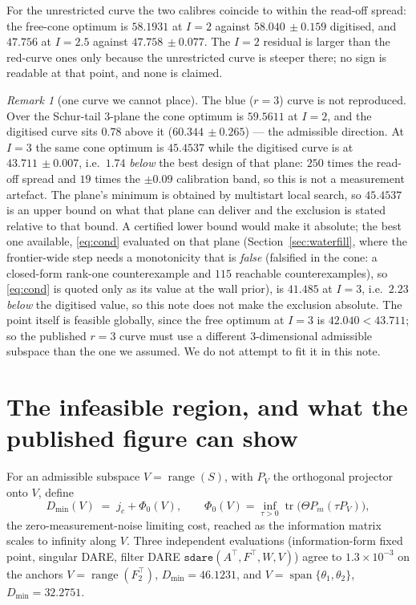 \documentclass[journal]{IEEEtran}
\theoremstyle{remark}
\newtheorem{remark}{Remark}
\begin{document}
For the unrestricted curve the two calibres coincide to within the read-off
spread: the free-cone optimum is $58.1931$ at $I=2$ against
$58.040\,\pm0.159$ digitised, and $47.756$ at $I=2.5$ against
$47.758\,\pm0.077$. The $I=2$ residual is larger than the red-curve ones only
because the unrestricted curve is steeper there; no sign is readable at that
point, and none is claimed. 

\begin{remark}[one curve we cannot place]
\label{rmk:blue}
The blue ($r=3$) curve is not reproduced. Over the Schur-tail $3$-plane the cone
optimum is $59.5611$ at $I=2$, and the digitised curve sits $0.78$ above it
($60.344\,\pm0.265$) --- the admissible direction. At $I=3$ the same cone optimum
is $45.4537$ while the digitised curve is at $43.711\,\pm0.007$, i.e.\ $1.74$
\emph{below} the best design of that plane: $250$ times the read-off spread and
$19$ times the $\pm0.09$ calibration band, so this is not a measurement artefact.
The plane's minimum is obtained by multistart local search, so $45.4537$ is an
upper bound on what that plane can deliver and the exclusion is stated relative
to that bound. A certified lower bound would make it absolute; the best one
available, \eqref{eq:cond} evaluated on that plane (Section~\ref{sec:waterfill},
where the frontier-wide step needs a monotonicity that is \emph{false}
(falsified in the cone: a closed-form rank-one counterexample and $115$
reachable counterexamples), so \eqref{eq:cond} is quoted only as its value at
the wall prior), is $41.485$ at $I=3$, i.e.\ $2.23$ \emph{below} the digitised value, so
this note does not make the exclusion absolute.
The point itself is feasible globally, since the free optimum at $I=3$ is
$42.040<43.711$; so the published $r=3$ curve must use a different
$3$-dimensional admissible subspace than the one we assumed. We do not attempt
to fit it in this note. 
\end{remark}

\section{The infeasible region, and what the published figure can show}
\label{sec:infeasible}

For an admissible subspace $V=\operatorname{range}(S)$, with $P_V$ the orthogonal
projector onto $V$, define
\begin{equation}
 D_{\min}(V)\;=\;j_c+\Phi_0(V),\qquad
 \Phi_0(V)=\inf_{\tau>0}\operatorname{tr}\!\big(\Theta P_m(\tau P_V)\big),
\end{equation}
the zero-measurement-noise limiting cost, reached as the information matrix
scales to infinity along $V$. Three independent evaluations (information-form
fixed point, singular DARE, filter DARE
$\texttt{sdare}(A^{\top},F^{\top},W,V)$) agree to $1.3\times10^{-3}$ on the
anchors $V=\operatorname{range}(F_2^{\top})$, $D_{\min}=46.1231$, and
$V=\operatorname{span}\{\theta_1,\theta_2\}$, $D_{\min}=32.2751$.
\end{document}
